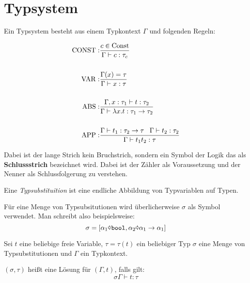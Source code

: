 \section{Typsystem}
\begin{definition}\label{def:typsystem-t1}%
	Ein Typsystem besteht aus einem Typkontext $\Gamma$ und folgenden Regeln:

	\begin{align*}
		\operatorname{CONST}:&\frac{c \in \text{Const}}{\Gamma \vdash c: \tau_c}\\
			   &\\
		\operatorname{VAR}:  &\frac{\Gamma(x) = \tau}{\Gamma \vdash x: \tau}\\
			   &\\
		\operatorname{ABS}:  &\frac{\Gamma, x: \tau_1 \vdash t: \tau_2}{\Gamma \vdash \lambda x. t: \tau_1 \rightarrow \tau_2}\\
			   &\\
		\operatorname{APP}:  &\frac{\Gamma \vdash t_1: \tau_2 \rightarrow \tau\;\;\; \Gamma \vdash t_2: \tau_2}{\Gamma \vdash t_1 t_2: \tau} \\
	\end{align*}
\end{definition}


Dabei ist der lange Strich kein Bruchstrich, sondern ein Symbol der Logik das als
\textbf{Schlussstrich} bezeichnet wird. Dabei ist der 
Zähler als Voraussetzung und der Nenner als Schlussfolgerung zu verstehen.

\begin{definition}[Typsubstituition]%
	Eine \textit{Typsubstituition} ist eine endliche Abbildung von Typvariablen auf
	Typen.
\end{definition}

Für eine Menge von Typsubsitutionen wird überlicherweise $\sigma$ als Symbol
verwendet. Man schreibt also beispielsweise:
\[\sigma = [\alpha_1 \text{\pointer} \text{\texttt{bool}}, \alpha_2 \text{\pointer} \alpha_1 \rightarrow \alpha_1]\]

\begin{definition}
	Sei $t$ eine beliebige freie Variable, $\tau = \tau(t)$ ein beliebiger Typ
	$\sigma$ eine Menge von Typsubstitutionen und $\Gamma$ ein Typkontext.

	$(\sigma, \tau)$ heißt eine Lösung für $(\Gamma, t)$, falls gilt:
	\[\sigma \Gamma \vdash t : \tau\]
\end{definition}

